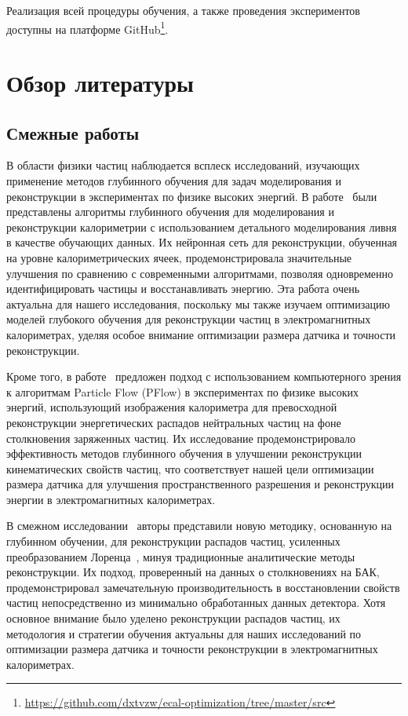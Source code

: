 \documentclass[a4paper,12pt]{extarticle}
\begin{document}
Реализация всей процедуры обучения, а также проведения экспериментов доступны на платформе GitHub\footnote{\url{https://github.com/dxtvzw/ecal-optimization/tree/master/src}}.

\section{Обзор литературы}
\label{section:related_work}

\subsection{Смежные работы}
\label{subsection:related_work}

В области физики частиц наблюдается всплеск исследований, изучающих применение методов глубинного обучения для задач моделирования и реконструкции в экспериментах по физике высоких энергий. В работе~\cite{Belayneh_2020} были представлены алгоритмы глубинного обучения для моделирования и реконструкции калориметрии с использованием детального моделирования ливня в качестве обучающих данных. Их нейронная сеть для реконструкции, обученная на уровне калориметрических ячеек, продемонстрировала значительные улучшения по сравнению с современными алгоритмами, позволяя одновременно идентифицировать частицы и восстанавливать энергию. Эта работа очень актуальна для нашего исследования, поскольку мы также изучаем оптимизацию моделей глубокого обучения для реконструкции частиц в электромагнитных калориметрах, уделяя особое внимание оптимизации размера датчика и точности реконструкции.

Кроме того, в работе~\cite{Di_Bello_2021} предложен подход с использованием компьютерного зрения к алгоритмам Particle Flow (PFlow) в экспериментах по физике высоких энергий, использующий изображения калориметра для превосходной реконструкции энергетических распадов нейтральных частиц на фоне столкновения заряженных частиц. Их исследование продемонстрировало эффективность методов глубинного обучения в улучшении реконструкции кинематических свойств частиц, что соответствует нашей цели оптимизации размера датчика для улучшения пространственного разрешения и реконструкции энергии в электромагнитных калориметрах.

В смежном исследовании~\cite{PhysRevD.108.052002} авторы представили новую методику, основанную на глубинном обучении, для реконструкции распадов частиц, усиленных преобразованием Лоренца~\cite{enwiki:1222502887}, минуя традиционные аналитические методы реконструкции. Их подход, проверенный на данных о столкновениях на БАК, продемонстрировал замечательную производительность в восстановлении свойств частиц непосредственно из минимально обработанных данных детектора. Хотя основное внимание было уделено реконструкции распадов частиц, их методология и стратегии обучения актуальны для наших исследований по оптимизации размера датчика и точности реконструкции в электромагнитных калориметрах.
\end{document}
